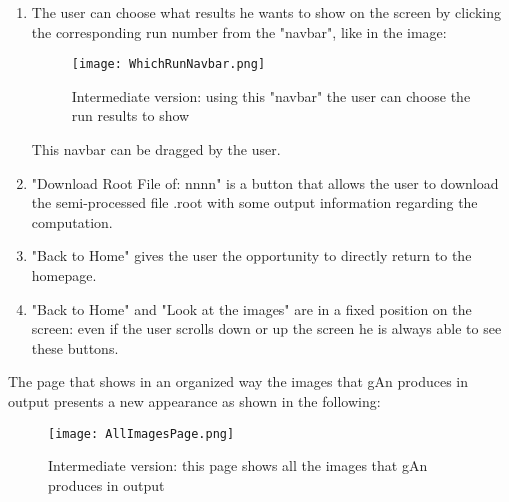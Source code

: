 \begin{enumerate}
\item The user can choose what results he wants to show on the screen by clicking the corresponding run number from the "navbar", like in the image:

\begin{figure}[H]
\centering
\texttt{[image: WhichRunNavbar.png]} 
\caption{Intermediate version: using this "navbar" the user can choose the run results to show}
\end{figure}

This navbar can be dragged by the user.

\item "Download Root File of: nnnn" is a button that allows the user to download the semi-processed file .root with some output information regarding the computation.

\item "Back to Home" gives the user the opportunity to directly return to the homepage. 

\item "Back to Home" and "Look at the images" are in a fixed position on the screen: even if the user scrolls down or up the screen he is always able to see these buttons.    

\end{enumerate}
The page that shows in an organized way the images that gAn produces in output presents a new appearance as shown in the following:



\begin{figure}[H]
\centering
\texttt{[image: AllImagesPage.png]} 
\caption{Intermediate version: this page shows all the images that gAn produces in output}
\end{figure}


